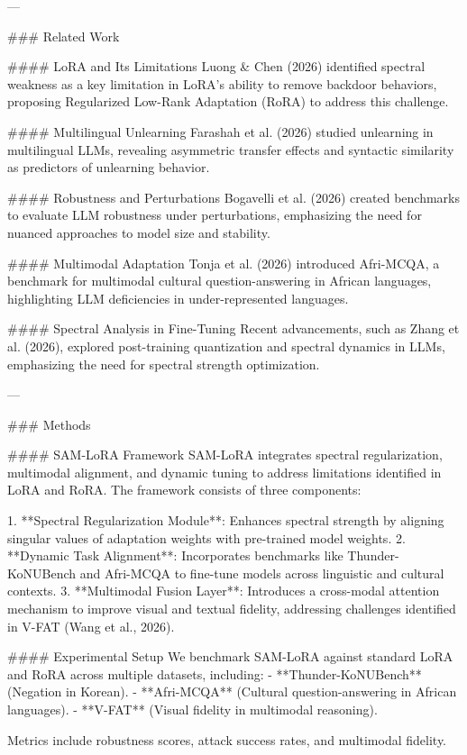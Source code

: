 ---

### Related Work  

#### LoRA and Its Limitations  
Luong & Chen (2026) identified spectral weakness as a key limitation in LoRA’s ability to remove backdoor behaviors, proposing Regularized Low-Rank Adaptation (RoRA) to address this challenge. 

#### Multilingual Unlearning  
Farashah et al. (2026) studied unlearning in multilingual LLMs, revealing asymmetric transfer effects and syntactic similarity as predictors of unlearning behavior.

#### Robustness and Perturbations  
Bogavelli et al. (2026) created benchmarks to evaluate LLM robustness under perturbations, emphasizing the need for nuanced approaches to model size and stability.

#### Multimodal Adaptation  
Tonja et al. (2026) introduced Afri-MCQA, a benchmark for multimodal cultural question-answering in African languages, highlighting LLM deficiencies in under-represented languages.

#### Spectral Analysis in Fine-Tuning  
Recent advancements, such as Zhang et al. (2026), explored post-training quantization and spectral dynamics in LLMs, emphasizing the need for spectral strength optimization.

---

### Methods  

#### SAM-LoRA Framework  
SAM-LoRA integrates spectral regularization, multimodal alignment, and dynamic tuning to address limitations identified in LoRA and RoRA. The framework consists of three components:

1. **Spectral Regularization Module**: Enhances spectral strength by aligning singular values of adaptation weights with pre-trained model weights.  
2. **Dynamic Task Alignment**: Incorporates benchmarks like Thunder-KoNUBench and Afri-MCQA to fine-tune models across linguistic and cultural contexts.  
3. **Multimodal Fusion Layer**: Introduces a cross-modal attention mechanism to improve visual and textual fidelity, addressing challenges identified in V-FAT (Wang et al., 2026).

#### Experimental Setup  
We benchmark SAM-LoRA against standard LoRA and RoRA across multiple datasets, including:  
- **Thunder-KoNUBench** (Negation in Korean).  
- **Afri-MCQA** (Cultural question-answering in African languages).  
- **V-FAT** (Visual fidelity in multimodal reasoning).  

Metrics include robustness scores, attack success rates, and multimodal fidelity.

